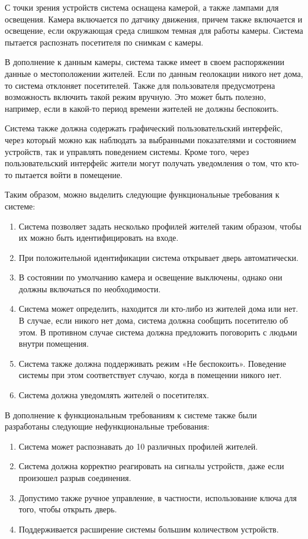 С точки зрения устройств система оснащена камерой, а также лампами для освещения. Камера включается по датчику движения, причем также включается и освещение, если окружающая среда слишком темная для работы камеры. Система пытается распознать посетителя по снимкам с камеры.

В дополнение к данным камеры, система также имеет в своем распоряжении данные о местоположении жителей. Если по данным геолокации никого нет дома, то система отклоняет посетителей. Также для пользователя предусмотрена возможность включить такой режим вручную. Это может быть полезно, например, если в какой-то период времени жителей не должны беспокоить.

Система также должна содержать графический пользовательский интерфейс, через который можно как наблюдать за выбранными показателями и состоянием устройств, так и управлять поведением системы. Кроме того, через пользовательский интерфейс жители могут получать уведомления о том, что кто-то пытается войти в помещение.

Таким образом, можно выделить следующие функциональные требования к системе:

\begin{enumerate}
	\item Система позволяет задать несколько профилей жителей таким образом, чтобы их можно быть идентифицировать на входе.
	\item При положительной идентификации система открывает дверь автоматически.
	\item В состоянии по умолчанию камера и освещение выключены, однако они должны включаться по необходимости.
	\item Система может определить, находится ли кто-либо из жителей дома или нет. В случае, если никого нет дома, система должна сообщить посетителю об этом. В противном случае система должна предложить поговорить с людьми внутри помещения.
	\item Система также должна поддерживать режим «Не беспокоить». Поведение системы при этом соответствует случаю, когда в помещении никого нет.
	\item Система должна уведомлять жителей о посетителях.
\end{enumerate}

В дополнение к функциональным требованиям к системе также были разработаны следующие нефункциональные требования:

\begin{enumerate}
	\item Система может распознавать до 10 различных профилей жителей.
	\item Система должна корректно реагировать на сигналы устройств, даже если произошел разрыв соединения.
	\item Допустимо также ручное управление, в частности, использование ключа для того, чтобы открыть дверь.
	\item Поддерживается расширение системы большим количеством устройств.
\end{enumerate}

